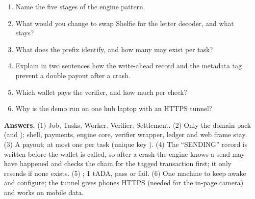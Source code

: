 \begin{quizbox}
\begin{enumerate}
  \item Name the five stages of the engine pattern.
  \item What would you change to swap Shelfie for the letter decoder, and what stays?
  \item What does the prefix  identify, and how many may exist per task?
  \item Explain in two sentences how the write-ahead record and the metadata tag prevent a double payout after a crash.
  \item Which wallet pays the verifier, and how much per check?
  \item Why is the demo run on one hub laptop with an HTTPS tunnel?
\end{enumerate}
{\small\color{cGrey}\textbf{Answers.}
(1) Job, Tasks, Worker, Verifier, Settlement.
(2) Only the domain pack (and ); shell, payments, engine core, verifier wrapper, ledger and web frame stay.
(3) A payout; at most one per task (unique key ).
(4) The ``SENDING'' record is written before the wallet is called, so after a crash the engine knows a send may have happened and checks the chain for the tagged transaction first; it only resends if none exists.
(5) ; 1 tADA, pass or fail.
(6) One machine to keep awake and configure; the tunnel gives phones HTTPS (needed for the in-page camera) and works on mobile data.}
\end{quizbox}
